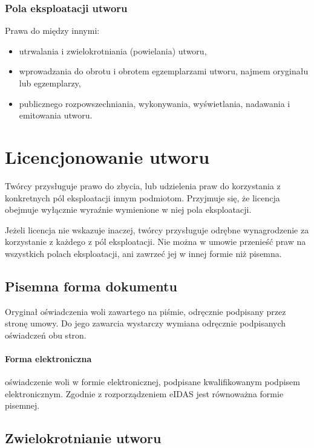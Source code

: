 \documentclass{article}
\begin{document}
\subsubsection{Pola eksploatacji utworu}

Prawa do między innymi:
\begin{itemize}
  \item utrwalania i zwielokrotniania (powielania) utworu,
  \item wprowadzania do obrotu i obrotem egzemplarzami utworu, najmem oryginału lub egzemplarzy,
  \item publicznego rozpowszechniania, wykonywania, wyświetlania, nadawania i emitowania utworu.
\end{itemize}

\section{Licencjonowanie utworu}

Twórcy przysługuje prawo do zbycia, lub udzielenia praw do korzystania z konkretnych pól eksploatacji innym podmiotom.
Przyjmuje się, że licencja obejmuje wyłącznie wyraźnie wymienione w niej pola eksploatacji.

Jeżeli licencja nie wskazuje inaczej, twórcy przysługuje odrębne wynagrodzenie za korzystanie z każdego z pól eksploatacji. Nie można w umowie przenieść praw na wszystkich polach eksploatacji, ani zawrzeć jej w innej formie niż pisemna.

\subsection{Pisemna forma dokumentu}

Oryginał oświadczenia woli zawartego na piśmie, odręcznie podpisany przez stronę umowy. Do jego zawarcia wystarczy wymiana odręcznie podpisanych oświadczeń obu stron.

\paragraph{Forma elektroniczna}

oświadczenie woli w formie elektronicznej, podpisane kwalifikowanym podpisem elektronicznym. Zgodnie z rozporządzeniem eIDAS jest równoważna formie pisemnej.

\subsection{Zwielokrotnianie utworu}
\end{document}
